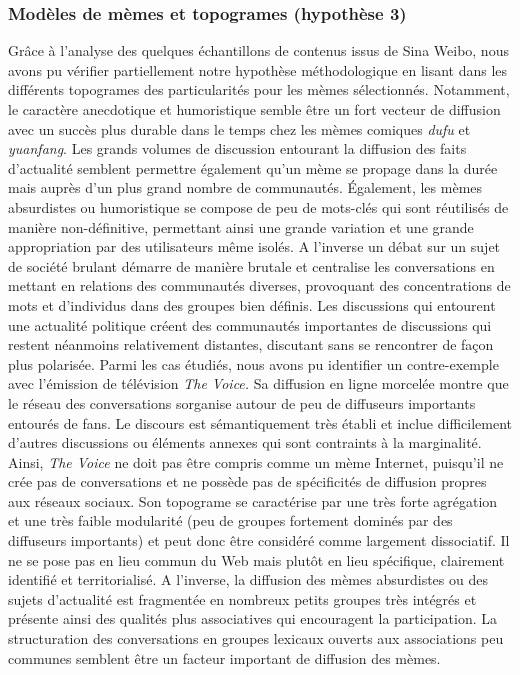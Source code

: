 \subsubsection{Mod\`eles de m\`emes et topogrames (hypoth\`ese 3)}
 
Gr\^ace \`a l{\textquoteright}analyse des quelques \'echantillons de contenus issus de Sina Weibo, nous avons pu v\'erifier partiellement notre hypoth\`ese m\'ethodologique en lisant dans les diff\'erents topogrames des particularit\'es pour les m\`emes s\'electionn\'es. Notamment, le caract\`ere anecdotique et humoristique semble \^etre un fort vecteur de diffusion avec un succ\`es plus durable dans le temps chez les m\`emes comiques \textit{dufu} et \textit{yuanfang}. Les grands volumes de discussion entourant la diffusion des faits d{\textquoteright}actualit\'e semblent permettre \'egalement qu{\textquoteright}un m\`eme se propage dans la dur\'ee mais aupr\`es d{\textquoteright}un plus grand nombre de communaut\'es. \'Egalement, les m\`emes absurdistes ou humoristique se compose de peu de mots-cl\'es qui sont r\'eutilis\'es de mani\`ere non-d\'efinitive, permettant ainsi une grande variation et une grande appropriation par des utilisateurs m\^eme isol\'es. A l{\textquoteright}inverse un d\'ebat sur un sujet de soci\'et\'e brulant d\'emarre de mani\`ere brutale et centralise les conversations en mettant en relations des communaut\'es diverses, provoquant des concentrations de mots et d{\textquoteright}individus dans des groupes bien d\'efinis. Les discussions qui entourent une actualit\'e politique cr\'eent des communaut\'es importantes de discussions qui restent n\'eanmoins relativement distantes, discutant sans se rencontrer de fa\c{c}on plus polaris\'ee. Parmi les cas \'etudi\'es, nous avons pu identifier un contre-exemple avec l{\textquoteright}\'emission de t\'el\'evision \textit{The Voice}\textit{. }Sa diffusion en ligne morcel\'ee montre que le r\'eseau des conversations s{\textquotesingle}organise autour de peu de diffuseurs importants entour\'es de fans. Le discours est s\'emantiquement tr\`es \'etabli et inclue difficilement d{\textquoteright}autres discussions ou \'el\'ements annexes qui sont contraints \`a la marginalit\'e. Ainsi, \textit{The Voice }ne doit pas \^etre compris comme un m\`eme Internet, puisqu{\textquoteright}il ne cr\'ee pas de conversations et ne poss\`ede pas de sp\'ecificit\'es de diffusion propres aux r\'eseaux sociaux. Son topograme se caract\'erise par une tr\`es forte agr\'egation et une tr\`es faible modularit\'e (peu de groupes fortement domin\'es par des diffuseurs importants) et peut donc \^etre consid\'er\'e comme largement dissociatif. Il ne se pose pas en lieu commun du Web mais plut\^ot en lieu sp\'ecifique, clairement identifi\'e et territorialis\'e. A l{\textquoteright}inverse, la diffusion des m\`emes absurdistes ou des sujets d{\textquoteright}actualit\'e est fragment\'ee en nombreux petits groupes tr\`es int\'egr\'es et pr\'esente ainsi des qualit\'es plus associatives qui encouragent la participation. La structuration des conversations en groupes lexicaux ouverts aux associations peu communes semblent \^etre un facteur important de diffusion des m\`emes.
 
